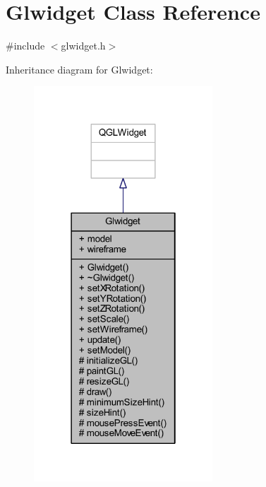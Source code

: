 \hypertarget{class_glwidget}{}\section{Glwidget Class Reference}
\label{class_glwidget}


{\ttfamily \#include $<$glwidget.\+h$>$}



Inheritance diagram for Glwidget\+:\nopagebreak
\begin{figure}[H]
\begin{center}
\leavevmode
\includegraphics[width=190pt]{class_glwidget__inherit__graph}
\end{center}
\end{figure}


